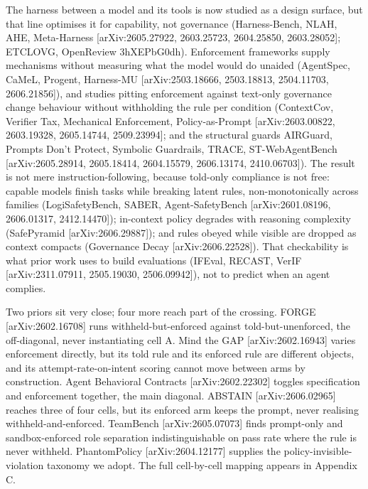 \documentclass{article}
\begin{document}
The harness between a model and its tools is now studied as a design surface, but that line optimises it for capability, not governance (Harness-Bench, NLAH, AHE, Meta-Harness {[}arXiv:2605.27922, 2603.25723, 2604.25850, 2603.28052{]}; ETCLOVG, OpenReview 3hXEPbG0dh). Enforcement frameworks supply mechanisms without measuring what the model would do unaided (AgentSpec, CaMeL, Progent, Harness-MU {[}arXiv:2503.18666, 2503.18813, 2504.11703, 2606.21856{]}), and studies pitting enforcement against text-only governance change behaviour without withholding the rule per condition (ContextCov, Verifier Tax, Mechanical Enforcement, Policy-as-Prompt {[}arXiv:2603.00822, 2603.19328, 2605.14744, 2509.23994{]}; and the structural guards AIRGuard, Prompts Don't Protect, Symbolic Guardrails, TRACE, ST-WebAgentBench {[}arXiv:2605.28914, 2605.18414, 2604.15579, 2606.13174, 2410.06703{]}). The result is not mere instruction-following, because told-only compliance is not free: capable models finish tasks while breaking latent rules, non-monotonically across families (LogiSafetyBench, SABER, Agent-SafetyBench {[}arXiv:2601.08196, 2606.01317, 2412.14470{]}); in-context policy degrades with reasoning complexity (SafePyramid {[}arXiv:2606.29887{]}); and rules obeyed while visible are dropped as context compacts (Governance Decay {[}arXiv:2606.22528{]}). That checkability is what prior work uses to build evaluations (IFEval, RECAST, VerIF {[}arXiv:2311.07911, 2505.19030, 2506.09942{]}), not to predict when an agent complies.

Two priors sit very close; four more reach part of the crossing. FORGE {[}arXiv:2602.16708{]} runs withheld-but-enforced against told-but-unenforced, the off-diagonal, never instantiating cell A. Mind the GAP {[}arXiv:2602.16943{]} varies enforcement directly, but its told rule and its enforced rule are different objects, and its attempt-rate-on-intent scoring cannot move between arms by construction. Agent Behavioral Contracts {[}arXiv:2602.22302{]} toggles specification and enforcement together, the main diagonal. ABSTAIN {[}arXiv:2606.02965{]} reaches three of four cells, but its enforced arm keeps the prompt, never realising withheld-and-enforced. TeamBench {[}arXiv:2605.07073{]} finds prompt-only and sandbox-enforced role separation indistinguishable on pass rate where the rule is never withheld. PhantomPolicy {[}arXiv:2604.12177{]} supplies the policy-invisible-violation taxonomy we adopt. The full cell-by-cell mapping appears in Appendix C.
\end{document}
